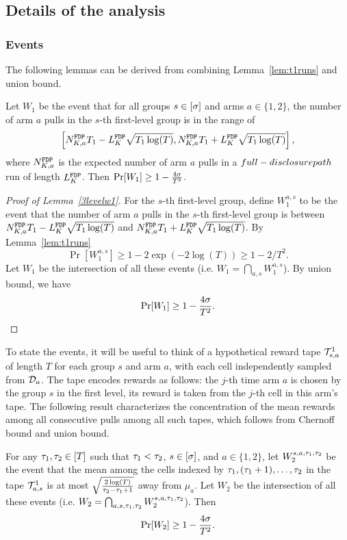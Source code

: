 
\subsection{Details of the analysis}
\label{sec:3level-pfs}

\subsubsection*{Events}

The following lemmas can be derived from combining Lemma~\ref{lem:t1runs} and union bound.

\begin{lemma}\label{3levelw1}
  Let $W_1$ be the event that for all groups $s\in [\sigma]$ and arms
  $a\in \{1, 2\}$, the number of arm $a$ pulls in the $s$-th
  first-level group is in the range of
  $$
  \left[N^\mathtt{FDP}_{K,a}  T_1- L^\mathtt{FDP}_K \sqrt{T_1\log(T)}, N^\mathtt{FDP}_{K,a}  T_1 + L^\mathtt{FDP}_K \sqrt{T_1\log(T)}\right],
  $$
  where $N^\mathtt{FDP}_{K,a} $ is the expected number of arm $a$ pulls in a $full-disclosure path$ run
  of length $L^\mathtt{FDP}_K$. Then $\Pr[W_1] \geq 1- \frac{4\sigma}{T^2}$.
\end{lemma}

\begin{proof}[Proof of Lemma~\ref{3levelw1}]
  For the $s$-th first-level group, define $W_1^{a,s}$ to be the event
  that the number of arm $a$ pulls in the $s$-th first-level group is
  between $N^\mathtt{FDP}_{K,a} T_1- L^\mathtt{FDP}_K \sqrt{T_1\log(T)}$ and
  $N^\mathtt{FDP}_{K,a} T_1 + L^\mathtt{FDP}_K \sqrt{T_1\log(T)}$. By Lemma~\ref{lem:t1runs}
\[
\Pr[W_1^{a,s}] \geq 1-2\exp(-2\log(T)) \geq 1-2/T^2.
\]
Let $W_1$  be the intersection of all these events (i.e.
$W_1 = \bigcap_{a,s}W_1^{a,s}$). By union bound, we have
\[
\Pr[W_1] \geq 1- \frac{4\sigma}{T^2}.
\]
\end{proof}

To state the events, it will be useful to think of a
hypothetical reward tape $\mathcal{T}^1_{s, a}$ of length $T$ for each
group $s$ and arm $a$, with each cell independently sampled from
$\mathcal{D}_a$.  The tape encodes rewards as follows: the $j$-th time arm $a$
is chosen by the group $s$ in the first level, its reward is taken
from the $j$-th cell in this arm's tape. The following result
characterizes the concentration of the mean rewards among all
consecutive pulls among all such tapes, which follows from Chernoff
bound and union bound.

\begin{lemma}\label{3levelw2}
  For any $\tau_1, \tau_2\in [T]$ such that $\tau_1 < \tau_2$, $s\in [\sigma]$, and
  $a\in \{1,2\}$, let $W_2^{s,a,\tau_1,\tau_2}$ be the event that the mean
  among the cells indexed by $\tau_1, (\tau_1+1), \ldots, \tau_2$ in the tape
  $\mathcal{T}^1_{a, s}$ is at most $\sqrt{\frac{2\log(T)}{\tau_2-\tau_1+1}}$ away
  from $\mu_a$.  Let $W_2$ be the intersection of all these events
  (i.e.  $W_2 = \bigcap_{a,s,\tau_1,\tau_2} W_2^{s,a,\tau_1,\tau_2}$). Then
  \[
    \Pr[W_2] \geq 1- \frac{4\sigma}{T^2}.
  \]
\end{lemma}


